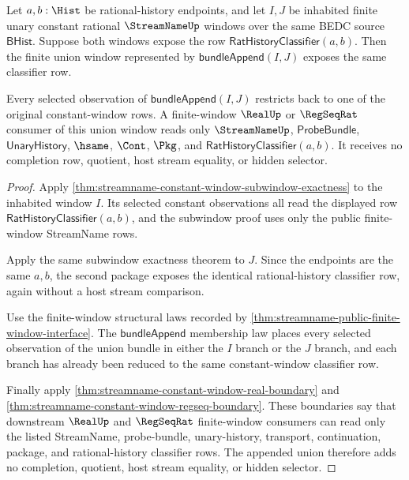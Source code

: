 \begin{theorem}
\label{thm:streamname-constant-window-union-exactness}
Let $a,b:\Hist$ be rational-history endpoints, and let $I,J$ be inhabited
finite unary constant rational $\StreamNameUp$ windows over the same BEDC
source $\mathsf{BHist}$. Suppose both windows expose the row
$\mathsf{RatHistoryClassifier}(a,b)$. Then the finite union window represented
by $\mathsf{bundleAppend}(I,J)$ exposes the same classifier row.

Every selected observation of $\mathsf{bundleAppend}(I,J)$ restricts back to one
of the original constant-window rows. A finite-window $\RealUp$ or
$\RegSeqRat$ consumer of this union window reads only $\StreamNameUp$,
$\mathsf{ProbeBundle}$, $\mathsf{UnaryHistory}$, $\hsame$, $\Cont$, $\Pkg$, and
$\mathsf{RatHistoryClassifier}(a,b)$. It receives no completion row, quotient,
host stream equality, or hidden selector.
\end{theorem}
\begin{proof}
Apply \autoref{thm:streamname-constant-window-subwindow-exactness} to the
inhabited window $I$. Its selected constant observations all read the displayed
row $\mathsf{RatHistoryClassifier}(a,b)$, and the subwindow proof uses only the
public finite-window StreamName rows.

Apply the same subwindow exactness theorem to $J$. Since the endpoints are the
same $a,b$, the second package exposes the identical rational-history
classifier row, again without a host stream comparison.

Use the finite-window structural laws recorded by
\autoref{thm:streamname-public-finite-window-interface}. The
$\mathsf{bundleAppend}$ membership law places every selected observation of the
union bundle in either the $I$ branch or the $J$ branch, and each branch has
already been reduced to the same constant-window classifier row.

Finally apply \autoref{thm:streamname-constant-window-real-boundary} and
\autoref{thm:streamname-constant-window-regseq-boundary}. These boundaries say
that downstream $\RealUp$ and $\RegSeqRat$ finite-window consumers can read only
the listed StreamName, probe-bundle, unary-history, transport, continuation,
package, and rational-history classifier rows. The appended union therefore
adds no completion, quotient, host stream equality, or hidden selector.
\end{proof}

